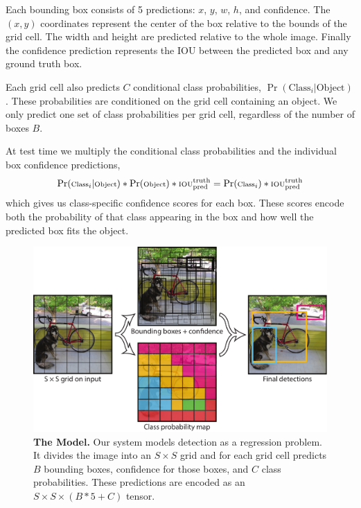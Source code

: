 \documentclass[10pt,twocolumn,letterpaper]{article}
\begin{document}
Each bounding box consists of 5 predictions: $x$, $y$, $w$, $h$, and confidence. The $(x,y)$ coordinates represent the center of the box relative to the bounds of the grid cell. The width and height are predicted relative to the whole image. Finally the confidence prediction represents the IOU between the predicted box and any ground truth box.

Each grid cell also predicts $C$ conditional class probabilities, $\Pr(\textrm{Class}_i | \textrm{Object})$. These probabilities are conditioned on the grid cell containing an object. We only predict one set of class probabilities per grid cell, regardless of the number of boxes $B$.

At test time we multiply the conditional class probabilities and the individual box confidence predictions,
\begin{equation}
\scriptsize
\Pr(\textrm{Class}_i | \textrm{Object}) * \Pr(\textrm{Object}) * \textrm{IOU}_{\textrm{pred}}^{\textrm{truth}} = \Pr(\textrm{Class}_i)*\textrm{IOU}_{\textrm{pred}}^{\textrm{truth}}
\end{equation}
which gives us class-specific confidence scores for each box. These scores encode both the probability of that class appearing in the box and how well the predicted box fits the object.


\begin{figure}[h]
\begin{center}
    \includegraphics[width=\linewidth]{model}
\end{center}
   \caption{\small \textbf{The Model.} Our system models detection as a regression problem. It divides the image into an $S \times S$ grid and for each grid cell predicts $B$ bounding boxes, confidence for those boxes, and $C$ class probabilities. These predictions are encoded as an $S \times S \times (B*5 + C)$ tensor.}
\label{model}
\end{figure}
\end{document}
